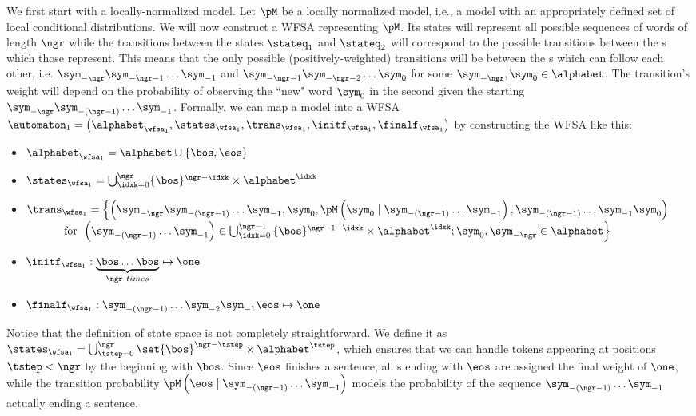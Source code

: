 We first start with a locally-normalized model.
Let $\pM$ be a locally normalized \ngram{} model, i.e., a model with an appropriately defined set of local conditional distributions.
We will now construct a WFSA representing $\pM$.
Its states will represent all possible sequences of words of length $\ngr$ while the transitions between the states $\stateq_1$ and $\stateq_2$ will correspond to the possible transitions between the \ngram{}s which those represent. 
This means that the only possible (positively-weighted) transitions will be between the \ngram{}s which can follow each other, i.e. $\sym_{-\ngr} \sym_{-\ngr - 1} \dots \sym_{-1}$ and $\sym_{-\ngr - 1} \sym_{-\ngr - 2} \dots \sym_{0}$ for some $\sym_{-\ngr}, \sym_{0} \in \alphabet$.
The transition's weight will depend on the probability of observing the ``new" word $\sym_{0}$ in the second \ngram{} given the starting \ngram{} $\sym_{-\ngr} \sym_{-(\ngr - 1)} \dots \sym_{-1}$. 
Formally, we can map a \ngram{} model into a WFSA $\automaton_1 = \left(\alphabet_{\wfsa_1}, \states_{\wfsa_1}, \trans_{\wfsa_1}, \initf_{\wfsa_1}, \finalf_{\wfsa_1}\right)$ by constructing the WFSA like this:
\begin{itemize}
    \item $\alphabet_{\wfsa_1} = \alphabet \cup \{\bos, \eos\}$
    \item $\states_{\wfsa_1} = \bigcup_{\idxk = 0}^{\ngr} \{\bos\}^{\ngr-\idxk} \times \alphabet^{\idxk}$
    \item $\trans_{\wfsa_1} = \left\{ \left(\sym_{-\ngr} \sym_{-(\ngr - 1)} \dots \sym_{-1}, \sym_{0} , \pM \left( \sym_{0} \mid \sym_{-(\ngr - 1)} \dots \sym_{-1} \right), \sym_{-(\ngr - 1)} \dots \sym_{-1} \sym_{0} \right) \right.$
    $\quad \quad \quad \text{ for }\left. \left( \sym_{-(\ngr - 1)} \dots \sym_{-1} \right) \in \bigcup_{\idxk = 0}^{\ngr-1}{\{\bos\}^{\ngr-1-\idxk} \times \alphabet^{\idxk}; \sym_{0}, \sym_{-\ngr} \in \alphabet } \vphantom{\left(\sym_{-\ngr} \sym_{-(\ngr - 1)} \dots \sym_{-1}, \sym_{0} , \pM \left( \sym_{0} \mid \sym_{-(\ngr - 1)} \dots \sym_{-1} \right), \sym_{-(\ngr - 1)} \dots \sym_{-1} \sym_{0} \right)} \right\}$
    \item $\initf_{\wfsa_1}: \underbrace{\bos \dots \bos}_{\ngr \  times} \mapsto \one$
    \item $\finalf_{\wfsa_1}: \sym_{-(\ngr - 1)} \dots \sym_{-2} \sym_{-1} \eos \mapsto \one $
\end{itemize}
Notice that the definition of state space is not completely straightforward. We define it as $\states_{\wfsa_1} = \bigcup_{\tstep = 0}^{\ngr} \set{\bos}^{\ngr-\tstep} \times \alphabet^{\tstep}$, which ensures that we can handle tokens appearing at positions $\tstep < \ngr$ by  the beginning with $\bos$. 
Since $\eos$ finishes a sentence, all \ngram{}s ending with $\eos$ are assigned the final weight of $\one$, while the transition probability $\pM\left( \eos \mid \sym_{-(\ngr - 1)} \dots \sym_{-1} \right)$ models the probability of the sequence $\sym_{-(\ngr - 1)} \dots \sym_{-1}$ actually ending a sentence.

